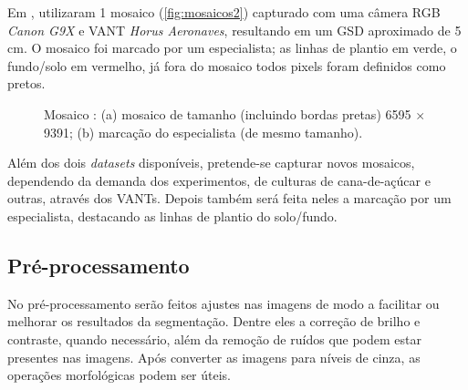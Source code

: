 \documentclass[12pt, a4paper, english, brazil]{article}
\begin{document}
Em , utilizaram 1 mosaico \cite{CropRowsDataset2019} (\autoref{fig:mosaicos2}) capturado com uma câmera RGB \textit{Canon G9X} e VANT \textit{Horus Aeronaves}, resultando em um GSD aproximado de 5 cm. O mosaico foi marcado por um especialista; as linhas de plantio em verde, o fundo/solo em vermelho, já fora do mosaico todos pixels foram definidos como pretos.

\begin{figure}[htbp]
    \centering
    \caption{Mosaico : (a) mosaico de tamanho (incluindo bordas pretas) 6595 $\times$ 9391; (b) marcação do especialista (de mesmo tamanho).}
    \label{fig:mosaicos2}
\end{figure}

Além dos dois \textit{datasets} disponíveis, pretende-se capturar novos mosaicos, dependendo da demanda dos experimentos, de culturas de cana-de-açúcar e outras, através dos VANTs. Depois também será feita neles a marcação por um especialista, destacando as linhas de plantio do solo/fundo.

\subsection{Pré-processamento}

No pré-processamento serão feitos ajustes nas imagens de modo a facilitar ou melhorar os resultados da segmentação. Dentre eles a correção de brilho e contraste, quando necessário, além da remoção de ruídos que podem estar presentes nas imagens. Após converter as imagens para níveis de cinza, as operações morfológicas podem ser úteis.
\end{document}
